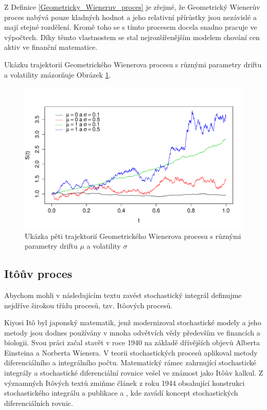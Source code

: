 \documentclass[a4paper,12pt]{report}
\theoremstyle{definition} \newtheorem{definice}[veta]{Definice}
\theoremstyle{remark}
\begin{document}
Z Definice \ref{Geometricky_Wieneruv_proces} je zřejmé, že Geometrický Wienerův proces nabývá pouze kladných hodnot a jeho relativní přírůstky jsou nezávislé a mají stejné rozdělení. 
Kromě toho se s tímto procesem docela snadno pracuje ve výpočtech. 
Díky těmto vlastnostem se stal nejrozšířenějším modelem chování cen aktiv ve finanční matematice.

Ukázku trajektorií Geometrického Wienerova procesu s různými parametry driftu a volatility znázorňuje Obrázek \ref{GP_graf}.

\begin{figure}[!htbp]
  \centering 
	\includegraphics[width=13.5cm, clip, trim= 0 15 25 50]{IMG/GP_v2.pdf}
  \caption{Ukázka pěti trajektorií Geometrického Wienerova procesu s různými parametry driftu $\mu$ a volatility $\sigma$}  \label{GP_graf}
\end{figure}


\subsection{It\^oův proces}
Abychom mohli v následujícím textu zavést stochastický integrál definujme nejdříve širokou třídu procesů, tzv. It\^oových procesů.

Kiyosi It\^o byl japonský matematik, jenž modernizoval stochastické modely a jeho metody jsou dodnes používány v mnoha odvětvích vědy především ve financích a biologii.
Svou práci začal stavět v roce 1940 na základě dřívějších objevů Alberta Einsteina a Norberta Wienera.
V teorii stochastických procesů aplikoval metody diferenciálního a integrálního počtu.
Matematický rámec zahrnující stochastické integrály a stochastické diferenciální rovnice vešel ve známost jako It\^oův kalkul.
Z významných It\^ových textů zmiňme 
článek \cite{ito1944} z roku 1944 obsahující konstrukci stochastického integrálu
a publikace \cite{ito1946} a
\cite{ito1951stochastic}, kde zavádí koncept stochastických diferenciálních rovnic.
\end{document}
